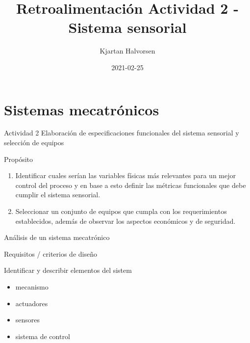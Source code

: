 \documentclass[presentation,aspectratio=169]{beamer}
\author{Kjartan Halvorsen}
\date{2021-02-25}
\title{Retroalimentación Actividad 2 - Sistema sensorial}
\begin{document}
\maketitle

\section{Sistemas mecatrónicos}
\label{sec:org988df47}

\begin{frame}[label={sec:org0458505}]{Actividad 2}
Elaboración de especificaciones funcionales del \alert{sistema sensorial} y selección de equipos

\begin{block}{Propósito}
\begin{enumerate}
\item Identificar cuales serían \alert{las variables físicas más relevantes para un mejor control} del proceso y en base a esto \alert{definir las métricas funcionales} que debe cumplir el sistema sensorial.

\item Seleccionar un conjunto de \alert{equipos que cumpla con los requerimientos establecidos}, además de observar los aspectos económicos y de seguridad.
\end{enumerate}
\end{block}
\end{frame}

\begin{frame}[label={sec:org11f527e}]{Análisis de un sistema mecatrónico}
\begin{block}{Requisitos / criterios de diseño}
\end{block}

\begin{block}{Identificar y describir elementos del sistem}
\begin{itemize}
\item mecanismo
\item actuadores
\item sensores
\item sistema de control
\end{itemize}
\end{block}
\end{frame}
\end{document}

